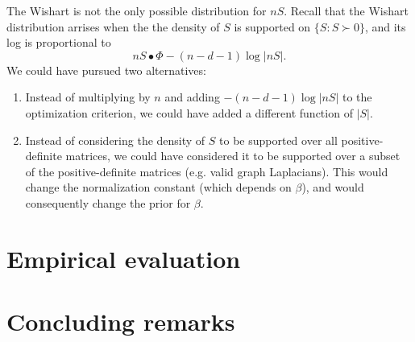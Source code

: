 \documentclass{article}
\begin{document}
The Wishart is not the only possible distribution for $n S$.  Recall that the
Wishart distribution arrises when the the density of $S$ is supported on
$\{ S : S \succ 0 \}$, and its log is proportional to
\[
    n S \bullet \Phi
        - (n-d-1) \log |n S|.
\]
We could have pursued two alternatives:
\begin{enumerate}
    \item Instead of multiplying by $n$ and adding $-(n-d-1) \log |n S|$ to the
        optimization criterion, we could have added a different function of
        $|S|$.
    \item Instead of considering the density of $S$ to be supported over
        all positive-definite matrices, we could have considered it to be
        supported over a subset of the positive-definite matrices
        (e.g. valid graph Laplacians).  This would change the normalization
        constant (which depends on $\beta$), and would consequently change the
        prior for $\beta$.
\end{enumerate}

\section{Empirical evaluation}

\section{Concluding remarks}



\end{document}
